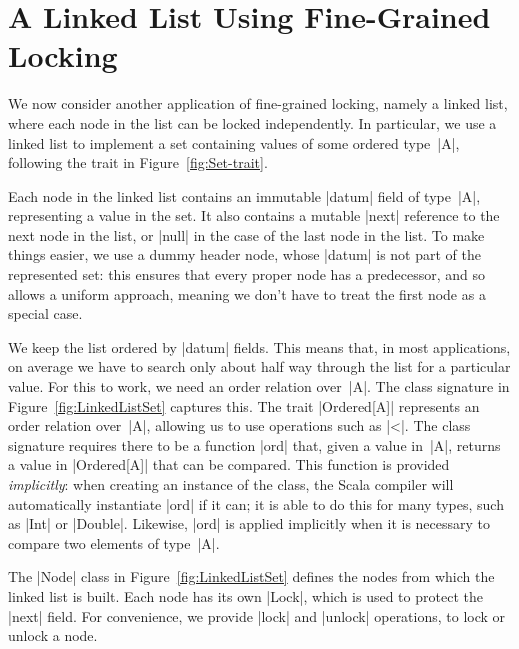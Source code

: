 \section{A Linked List Using Fine-Grained Locking}
\label{sec:linked-list-fine-grained}

We now consider another application of fine-grained
locking, namely a linked list, where each node in
the list can be locked independently.  In particular, we use a linked list to
implement a set containing values of some ordered type~|A|, following the
trait in Figure~\ref{fig:Set-trait}.

Each node in the linked list contains an immutable |datum| field of type~|A|,
representing a value in the set.  It also contains a mutable |next| reference
to the next node in the list, or |null| in the case of the last node in the
list.  To make things easier, we use a dummy header node, whose |datum| is not
part of the represented set: this ensures that every proper node has a
predecessor, and so allows a uniform approach, meaning we don't have to treat
the first node as a special case.

We keep the list ordered by |datum| fields.  This means that, in most
applications, on average we have to search only about half way through the
list for a particular value.  For this to work, we need an order relation
over~|A|.  The class signature in Figure~\ref{fig:LinkedListSet} captures
this.  The trait |Ordered[A]| represents an order relation over~|A|, allowing
us to use operations such as |<|.  The class signature requires there to be a
function |ord| that, given a value in~|A|, returns a value in |Ordered[A]|
that can be compared.  This function is provided \emph{implicitly}: when
creating an instance of the class, the Scala compiler will automatically
instantiate |ord| if it can; it is able to do this for many types, such as
|Int| or |Double|.  Likewise, |ord| is applied implicitly when it is necessary
to compare two elements of type~|A|.

The |Node| class in Figure~\ref{fig:LinkedListSet} defines the nodes from
which the linked list is built.  Each node has its own |Lock|, which is used
to protect the |next| field.  For convenience, we provide |lock| and |unlock|
operations, to lock or unlock a node.  


